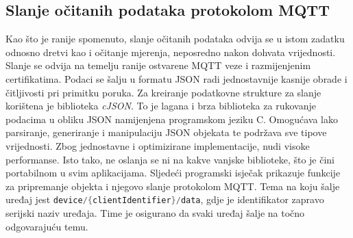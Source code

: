 \subsection{Slanje očitanih podataka protokolom MQTT}

Kao što je ranije spomenuto, slanje očitanih podataka odvija se u istom zadatku odnosno dretvi kao i očitanje mjerenja, neposredno nakon dohvata vrijednosti. Slanje se odvija na temelju ranije ostvarene MQTT veze i razmijenjenim certifikatima. Podaci se šalju u formatu JSON radi jednostavnije kasnije obrade i čitljivosti pri primitku poruka. Za kreiranje podatkovne strukture za slanje korištena je biblioteka \textit{cJSON}. To je lagana i brza biblioteka za rukovanje podacima u obliku JSON namijenjena programskom jeziku C. Omogućava lako parsiranje, generiranje i manipulaciju JSON objekata te podržava sve tipove vrijednosti. Zbog jednostavne i optimizirane implementacije, nudi visoke performanse. Isto tako, ne oslanja se ni na kakve vanjske biblioteke, što je čini portabilnom u svim aplikacijama. Sljedeći programski isječak prikazuje funkcije za pripremanje objekta i njegovo slanje protokolom MQTT. Tema na koju šalje uređaj jest \lstinline[language=c]|device/{clientIdentifier}/data|, gdje je identifikator zapravo serijski naziv uređaja. Time je osigurano da svaki uređaj šalje na točno odgovarajuću temu. 


